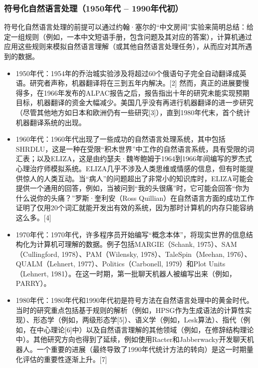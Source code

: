 \subsubsection{符号化自然语言处理（1950年代 – 1990年代初）}  
符号化自然语言处理的前提可以通过约翰·塞尔的“中文房间”实验来简明总结：给定一组规则（例如，一本中文短语手册，包含问题及其对应的答案），计算机通过应用这些规则来模拟自然语言理解（或其他自然语言处理任务），从而应对其所遇到的数据。
\begin{itemize}
\item 1950年代：1954年的乔治城实验涉及将超过60个俄语句子完全自动翻译成英语。研究者声称，机器翻译将在三到五年内解决。[2] 然而，真正的进展要慢得多，在1966年发布的ALPAC报告之后，报告指出十年的研究未能实现预期目标，机器翻译的资金大幅减少。美国几乎没有再进行机器翻译的进一步研究（尽管其他地方如日本和欧洲仍有一些研究[3]），直到1980年代末，首个统计机器翻译系统的出现。
\item 1960年代：1960年代出现了一些成功的自然语言处理系统，其中包括SHRDLU，这是一种在受限“积木世界”中工作的自然语言系统，具有受限的词汇表；以及ELIZA，这是由约瑟夫·魏岑鲍姆于1964到1966年间编写的罗杰式心理治疗师模拟系统。ELIZA几乎不涉及人类思维或情感的信息，但有时能提供惊人的人类互动。当“病人”的问题超出了非常小的知识库时，ELIZA可能会提供一个通用的回答，例如，当被问到“我的头很痛”时，它可能会回答“你为什么说你的头痛？”罗斯·奎利安（Ross Quillian）在自然语言方面的成功工作证明了仅用20个词汇就能开发出有效的系统，因为那时计算机的内存只能容纳这么多。[4]
\item 1970年代：1970年代，许多程序员开始编写“概念本体”，将现实世界的信息结构化为计算机可理解的数据。例子包括MARGIE（Schank, 1975）、SAM（Cullingford, 1978）、PAM（Wilensky, 1978）、TaleSpin（Meehan, 1976）、QUALM（Lehnert, 1977）、Politics（Carbonell, 1979）和Plot Units（Lehnert, 1981）。在这一时期，第一批聊天机器人被编写出来（例如，PARRY）。
\item 1980年代：1980年代和1990年代初是符号方法在自然语言处理中的黄金时代。当时的研究重点包括基于规则的解析（例如，HPSG作为生成语法的计算性实现）、形态学（例如，两级形态学[5]）、语义学（例如，Lesk算法）、指代（例如，在中心理论[6]中）以及自然语言理解的其他领域（例如，在修辞结构理论中）。其他研究方向也得到了延续，例如使用Racter和Jabberwacky开发聊天机器人。一个重要的进展（最终导致了1990年代统计方法的转向）是这一时期量化评估的重要性逐渐上升。[7]
\end{itemize}
